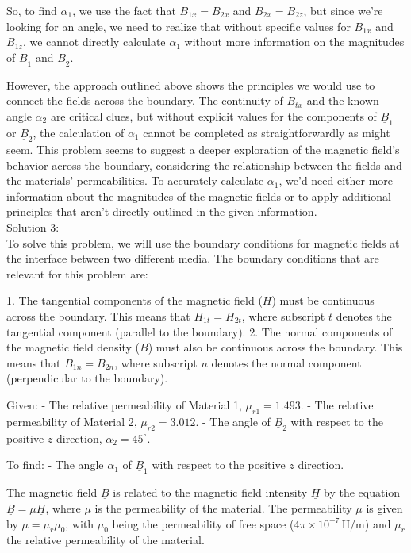 \documentclass[a4paper,11pt]{article}
\begin{document}
So, to find \( \alpha_{1} \), we use the fact that \(B_{1x} = B_{2x}\) and \(B_{2x} = B_{2z}\), but since we're looking for an angle, we need to realize that without specific values for \(B_{1x}\) and \(B_{1z}\), we cannot directly calculate \( \alpha_{1} \) without more information on the magnitudes of \( \underline{B}_{1} \) and \( \underline{B}_{2} \).

However, the approach outlined above shows the principles we would use to connect the fields across the boundary. The continuity of \(B_{tx}\) and the known angle \( \alpha_{2} \) are critical clues, but without explicit values for the components of \( \underline{B}_{1} \) or \( \underline{B}_{2} \), the calculation of \( \alpha_{1} \) cannot be completed as straightforwardly as might seem. This problem seems to suggest a deeper exploration of the magnetic field's behavior across the boundary, considering the relationship between the fields and the materials' permeabilities. To accurately calculate \( \alpha_{1} \), we'd need either more information about the magnitudes of the magnetic fields or to apply additional principles that aren't directly outlined in the given information. \\

\noindent Solution 3: \\

To solve this problem, we will use the boundary conditions for magnetic fields at the interface between two different media. The boundary conditions that are relevant for this problem are:

1. The tangential components of the magnetic field (\(H\)) must be continuous across the boundary. This means that \(H_{1t} = H_{2t}\), where subscript \(t\) denotes the tangential component (parallel to the boundary).
2. The normal components of the magnetic field density (\(B\)) must also be continuous across the boundary. This means that \(B_{1n} = B_{2n}\), where subscript \(n\) denotes the normal component (perpendicular to the boundary).

Given:
- The relative permeability of Material 1, \(\mu_{r1} = 1.493\).
- The relative permeability of Material 2, \(\mu_{r2} = 3.012\).
- The angle of \(\underline{B}_{2}\) with respect to the positive \(z\) direction, \(\alpha_{2} = 45^\circ\).

To find:
- The angle \(\alpha_{1}\) of \(\underline{B}_{1}\) with respect to the positive \(z\) direction.

The magnetic field \(\underline{B}\) is related to the magnetic field intensity \(\underline{H}\) by the equation \(\underline{B} = \mu \underline{H}\), where \(\mu\) is the permeability of the material. The permeability \(\mu\) is given by \(\mu = \mu_r \mu_0\), with \(\mu_0\) being the permeability of free space (\(4\pi \times 10^{-7} \, \text{H/m}\)) and \(\mu_r\) the relative permeability of the material.
\end{document}
